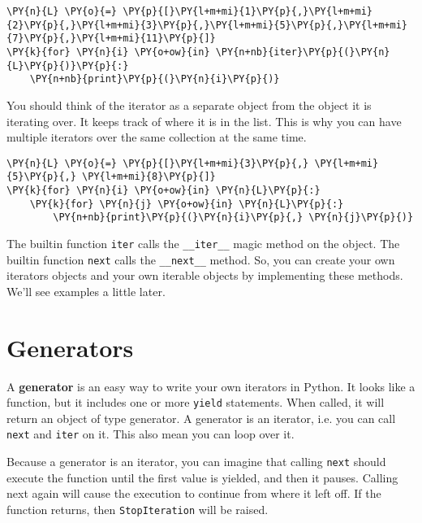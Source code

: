 \begin{Verbatim}[commandchars=\\\{\}]
\PY{n}{L} \PY{o}{=} \PY{p}{[}\PY{l+m+mi}{1}\PY{p}{,}\PY{l+m+mi}{2}\PY{p}{,}\PY{l+m+mi}{3}\PY{p}{,}\PY{l+m+mi}{5}\PY{p}{,}\PY{l+m+mi}{7}\PY{p}{,}\PY{l+m+mi}{11}\PY{p}{]}
\PY{k}{for} \PY{n}{i} \PY{o+ow}{in} \PY{n+nb}{iter}\PY{p}{(}\PY{n}{L}\PY{p}{)}\PY{p}{:}
    \PY{n+nb}{print}\PY{p}{(}\PY{n}{i}\PY{p}{)}
\end{Verbatim}



You should think of the iterator as a separate object from the object it is iterating over.  It keeps track of where it is in the list.  This is why you can have multiple iterators over the same collection at the same time.

\begin{Verbatim}[commandchars=\\\{\}]
\PY{n}{L} \PY{o}{=} \PY{p}{[}\PY{l+m+mi}{3}\PY{p}{,} \PY{l+m+mi}{5}\PY{p}{,} \PY{l+m+mi}{8}\PY{p}{]}
\PY{k}{for} \PY{n}{i} \PY{o+ow}{in} \PY{n}{L}\PY{p}{:}
    \PY{k}{for} \PY{n}{j} \PY{o+ow}{in} \PY{n}{L}\PY{p}{:}
        \PY{n+nb}{print}\PY{p}{(}\PY{n}{i}\PY{p}{,} \PY{n}{j}\PY{p}{)}
\end{Verbatim}



The builtin function \texttt{iter} calls the \texttt{\_\_iter\_\_} magic method on the object.  The builtin function \texttt{next} calls the \texttt{\_\_next\_\_} method.  So, you can create your own iterators objects and your own iterable objects by implementing these methods.  We’ll see examples a little later.

\section{Generators}


A \textbf{generator} is an easy way to write your own iterators in Python.  It looks like a function, but it includes one or more \texttt{yield} statements.  When called, it will return an object of type generator.  A generator is  an iterator, i.e. you can call \texttt{next} and \texttt{iter} on it.  This also mean you can loop over it.


Because a generator is an iterator, you can imagine that calling \texttt{next} should execute the function until the first value is yielded, and then it pauses.  Calling next again will cause the execution to continue from where it left off.  If the function returns, then \texttt{StopIteration} will be raised.  

